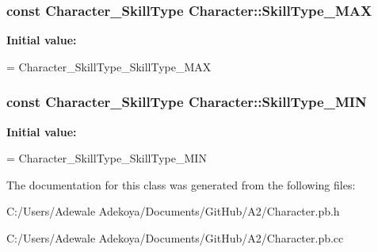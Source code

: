 \subsubsection[{Skill\+Type\+\_\+\+M\+A\+X}]{\setlength{\rightskip}{0pt plus 5cm}const Character\+\_\+\+Skill\+Type Character\+::\+Skill\+Type\+\_\+\+M\+A\+X\hspace{0.3cm}{\ttfamily [static]}}\label{classproto_1_1_character_aaa2541858654ab5995c7fc89dbd8b7a4}
{\bfseries Initial value\+:}
\begin{DoxyCode}
=
    Character\_SkillType\_SkillType\_MAX
\end{DoxyCode}
\hypertarget{classproto_1_1_character_a005cdf63cf199e2d29e4a4cec27e0526}{}
\subsubsection[{Skill\+Type\+\_\+\+M\+I\+N}]{\setlength{\rightskip}{0pt plus 5cm}const Character\+\_\+\+Skill\+Type Character\+::\+Skill\+Type\+\_\+\+M\+I\+N\hspace{0.3cm}{\ttfamily [static]}}\label{classproto_1_1_character_a005cdf63cf199e2d29e4a4cec27e0526}
{\bfseries Initial value\+:}
\begin{DoxyCode}
=
    Character\_SkillType\_SkillType\_MIN
\end{DoxyCode}


The documentation for this class was generated from the following files\+:\begin{DoxyCompactItemize}
\item 
C\+:/\+Users/\+Adewale Adekoya/\+Documents/\+Git\+Hub/\+A2/Character.\+pb.\+h\item 
C\+:/\+Users/\+Adewale Adekoya/\+Documents/\+Git\+Hub/\+A2/Character.\+pb.\+cc\end{DoxyCompactItemize}
